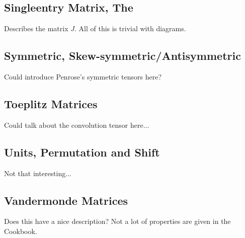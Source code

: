 \subsection{Singleentry Matrix, The}
Describes the matrix $J$.
All of this is trivial with diagrams.
\subsection{Symmetric, Skew-symmetric/Antisymmetric}

Could introduce Penrose's symmetric tensors here?

\subsection{Toeplitz Matrices}
Could talk about the convolution tensor here...
\subsection{Units, Permutation and Shift}
Not that interesting...
\subsection{Vandermonde Matrices}
Does this have a nice description?
Not a lot of properties are given in the Cookbook.


